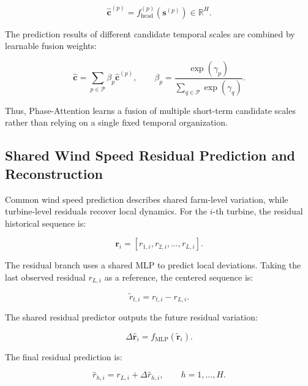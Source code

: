 \begin{equation}
\hat{\mathbf{c}}^{(p)} = f_{\mathrm{head}}^{(p)} \left( \mathbf{s}^{(p)} \right) \in \mathbb{R}^{H}.
\end{equation}

The prediction results of different candidate temporal scales are combined by learnable fusion weights:

\begin{equation}
\hat{\mathbf{c}} = \sum_{p\in\mathcal{P}} \beta_p\hat{\mathbf{c}}^{(p)}, \qquad \beta_p = \frac{\exp(\gamma_p)}{\sum_{q\in\mathcal{P}}\exp(\gamma_q)}.
\end{equation}

Thus, Phase-Attention learns a fusion of multiple short-term candidate scales rather than relying on a single fixed temporal organization.

\subsection{Shared Wind Speed Residual Prediction and Reconstruction}

Common wind speed prediction describes shared farm-level variation, while turbine-level residuals recover local dynamics. For the $i$-th turbine, the residual historical sequence is:

\begin{equation}
\mathbf{r}_i = [r_{1,i}, r_{2,i}, \ldots, r_{L,i}].
\end{equation}

The residual branch uses a shared MLP to predict local deviations. Taking the last observed residual $r_{L,i}$ as a reference, the centered sequence is:

\begin{equation}
\widetilde{r}_{t,i} = r_{t,i}-r_{L,i}.
\end{equation}

The shared residual predictor outputs the future residual variation:

\begin{equation}
\Delta\hat{\mathbf{r}}_i = f_{\mathrm{MLP}} \left( \widetilde{\mathbf{r}}_i \right).
\end{equation}

The final residual prediction is:

\begin{equation}
\hat{r}_{h,i} = r_{L,i} + \Delta\hat{r}_{h,i}, \qquad h=1,\ldots,H.
\end{equation}

